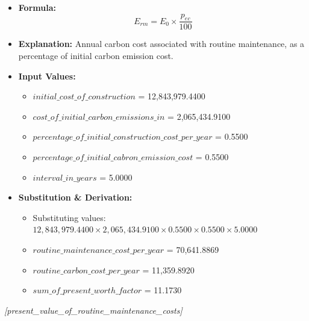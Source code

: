 \documentclass[12pt,a4paper]{article}
\begin{document}
\begin{itemize}
  \item \textbf{Formula:} $$E_{rm} = E_0 \times \frac{p_{ec}}{100}$$
  \item \textbf{Explanation:} Annual carbon cost associated with routine maintenance, as a percentage of initial carbon emission cost.
  \item \textbf{Input Values:}
  \begin{itemize}
    \item $initial\_cost\_of\_construction$ = 12,843,979.4400
    \item $cost\_of\_initial\_carbon\_emissions\_in$ = 2,065,434.9100
    \item $percentage\_of\_initial\_construction\_cost\_per\_year$ = 0.5500
    \item $percentage\_of\_initial\_cabron\_emission\_cost$ = 0.5500
    \item $interval\_in\_years$ = 5.0000
  \end{itemize}
  \item \textbf{Substitution \& Derivation:}
  \begin{itemize}
    \item Substituting values: $12,843,979.4400 \times 2,065,434.9100 \times 0.5500 \times 0.5500 \times 5.0000$
    \item $routine\_maintenance\_cost\_per\_year$ = 70,641.8869
    \item $routine\_carbon\_cost\_per\_year$ = 11,359.8920
    \item $sum\_of\_present\_worth\_factor$ = 11.1730
  \end{itemize}
\end{itemize}


\textit{[present\_value\_of\_routine\_maintenance\_costs]}
\end{document}
